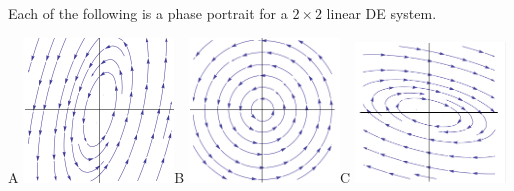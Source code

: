 \documentclass[epsf]{article}
\begin{document}
\newpage

Each of the following is a phase portrait for a $2\times 2$ linear DE system. \\


\begin{center}
A \includegraphics[width=40mm]{center1.png}\hspace{0.6 cm}B \includegraphics[width=40mm]{center2.png}\hspace{0.6cm}C \includegraphics[width=40mm]{center3.png}\\


\end{center}
\end{document}
